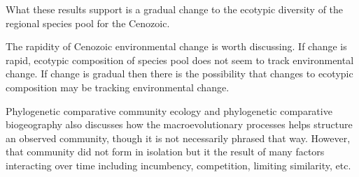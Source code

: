 \documentclass[12pt,letterpaper]{article}
\begin{document}
What these results support is a gradual change to the ecotypic diversity of the regional species pool for the Cenozoic.

The rapidity of Cenozoic environmental change is worth discussing. If change is rapid, ecotypic composition of species pool does not seem to track environmental change. If change is gradual then there is the possibility that changes to ecotypic composition may be tracking environmental change.


Phylogenetic comparative community ecology and phylogenetic comparative biogeography also discusses how the macroevolutionary processes helps structure an observed community, though it is not necessarily phrased that way. However, that community did not form in isolation but it the result of many factors interacting over time including incumbency, competition, limiting similarity, etc.
\end{document}
